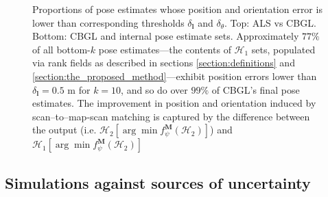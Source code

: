 \begin{figure}
  
  \vspace{0.01cm}
  \caption{\small Proportions of pose estimates whose position and orientation
           error is lower than corresponding thresholds $\delta_{\bm{l}}$ and
           $\delta_{\theta}$. Top: ALS vs CBGL. Bottom: CBGL and internal pose
           estimate sets.  Approximately $77\%$ of all bottom-$k$ pose
           estimates---the contents of $\mathcal{H}_1$ sets, populated via rank
           fields as described in sections \ref{section:definitions} and
           \ref{section:the_proposed_method}---exhibit position errors lower
           than $\delta_{\bm{l}} = 0.5$ m for $k=10$, and so do over $99\%$ of
           CBGL's final pose estimates. The improvement in position and
           orientation induced by scan--to--map-scan matching is captured by
           the difference between the output (i.e.  $\mathcal{H}_2[\arg \min
           f_{\psi}^{\bm{M}}(\mathcal{H}_2)]$) and $\mathcal{H}_1[\arg \min
           f_{\psi}^{\bm{M}}(\mathcal{H}_2)]$}
  \label{fig:a:awesomeness}
\end{figure}


\subsection{Simulations against sources of uncertainty}
\label{subsec:exp_b}

